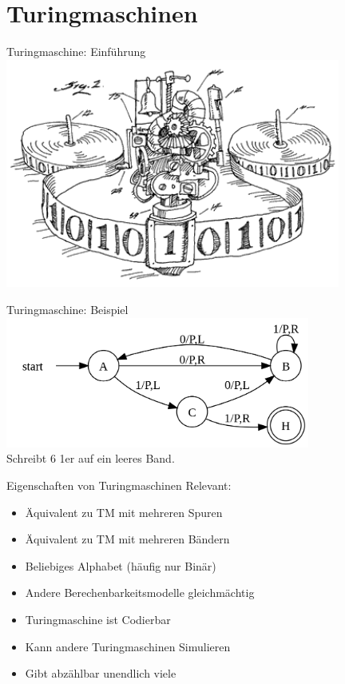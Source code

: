 \section{Turingmaschinen}

\begin{frame}[c]{Turingmaschine: Einführung}
    \includegraphics[width=11cm]{proseminar/images/turing-machine.png}
\end{frame}


\begin{frame}[c]{Turingmaschine: Beispiel}
    \includegraphics[width=10cm]{proseminar/images/tm-ex1.png} \\
    Schreibt 6 1er auf ein leeres Band.
\end{frame}


\begin{frame}[c]{Eigenschaften von Turingmaschinen}
    Relevant:
    \begin{itemize}
            \pause
        \item Äquivalent zu TM mit mehreren Spuren
            \pause
        \item Äquivalent zu TM mit mehreren Bändern
            \pause
        \item Beliebiges Alphabet (häufig nur Binär)
            \pause
        \item Andere Berechenbarkeitsmodelle gleichmächtig
            \pause
        \item Turingmaschine ist Codierbar
            \pause
        \item Kann andere Turingmaschinen Simulieren
            \pause
        \item Gibt abzählbar unendlich viele
    \end{itemize}
\end{frame}



